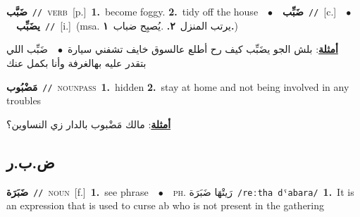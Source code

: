 \documentclass[10pt,a4paper,twoside]{article} %
\begin{document}
\begin{multicols}{2}
{\setlength\topsep{0pt}\textbf{\foreignlanguage{arabic}{ضَبَّب}}\ {\color{gray}\texttt{//}\color{black}}\ \textsc{verb}\ [p.]\ \textbf{1.}~become foggy.  \textbf{2.}~tidy off the house\ \ $\bullet$\ \ \setlength\topsep{0pt}\textbf{\foreignlanguage{arabic}{ضَبِّب}}\ {\color{gray}\texttt{//}\color{black}}\ [c.]\ \ $\bullet$\ \ \setlength\topsep{0pt}\textbf{\foreignlanguage{arabic}{يضَبِّب}}\ {\color{gray}\texttt{//}\color{black}}\ [i.]\ \color{gray}(msa. \foreignlanguage{arabic}{يرتب المنزل}~\foreignlanguage{arabic}{\textbf{٢.}}  .\foreignlanguage{arabic}{يُصبِح ضباب}~\foreignlanguage{arabic}{\textbf{١.}})\color{black}\  \begin{flushright}\color{gray}\foreignlanguage{arabic}{\textbf{\underline{\foreignlanguage{arabic}{أمثلة}}}: بلش الجو يضَبِّب كيف رح أطلع عالسوق خايف تشفني سيارة\ $\bullet$\ \  ضَبِّب اللي بتقدر عليه بهالغرفة وأنا بكمل عنك}\end{flushright}\color{black}} \vspace{2mm}

{\setlength\topsep{0pt}\textbf{\foreignlanguage{arabic}{مَضْبُوب}}\ {\color{gray}\texttt{//}\color{black}}\ \textsc{noun\textunderscore pass}\ \textbf{1.}~hidden  \textbf{2.}~stay at home and not being involved in any troubles\  \begin{flushright}\color{gray}\foreignlanguage{arabic}{\textbf{\underline{\foreignlanguage{arabic}{أمثلة}}}: مالك مَضْبوب بالدار زي النساوين؟}\end{flushright}\color{black}} \vspace{2mm}

\vspace{-3mm}
\subsection*{\color{blue}\foreignlanguage{arabic}{ض.ب.ر}\color{blue}{}} 

{\setlength\topsep{0pt}\textbf{\foreignlanguage{arabic}{ضَبَرَة}}\ {\color{gray}\texttt{//}\color{black}}\ \textsc{noun}\ [f.]\ \textbf{1.}~see phrase\ \ $\bullet$\ \ \textsc{ph.} \color{gray} \foreignlanguage{arabic}{رَيتْهَا ضَبَرَة}\color{black}\ {\color{gray}\texttt{/{\sffamily reːtha dˤabara}/}\color{black}}\ \textbf{1.}~It is an expression that is used to curse ab who is not present in the gathering\ } \vspace{2mm}


\end{multicols}
\end{document}
